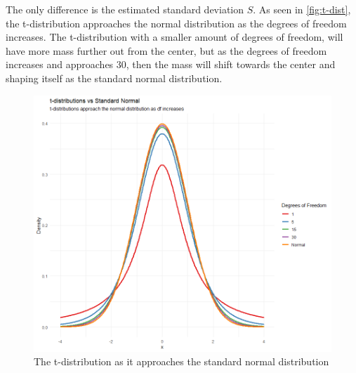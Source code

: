 The only difference is the estimated standard deviation $S$.
As seen in \autoref{fig:t-dist}, the t-distribution approaches the normal distribution as the degrees of freedom increases. The t-distribution with a smaller amount of degrees of freedom, will have more mass further out from the center, but as the degrees of freedom increases and approaches 30, then the mass will shift towards the center and shaping itself as the standard normal distribution.
\begin{figure}[h!]
	\centering
	\begin{minipage}{0.80\textwidth}
		\centering
		\includegraphics[width=\linewidth]{billder/T_distribution.png}
		\caption{The t-distribution as it approaches the standard normal distribution}
		\label{fig:t-dist}
	\end{minipage}\hfill
\end{figure}
